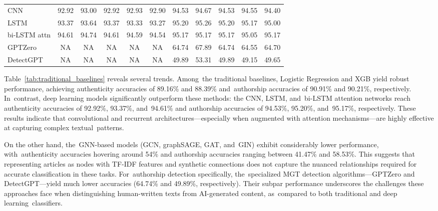 \documentclass[electronics,article,accept,pdftex,moreauthors,electronics]{Definitions/mdpi}
\begin{document}
\begin{table}[H]
{\begin{tabular}{lcccccccccc}
CNN &
92.92 & 93.00 & 92.92 & 92.93 & 92.90 &
 94.53 & 94.67 & 94.53 & 94.55 & 94.40 \\

LSTM &
93.37 & 93.64 & 93.37 & 93.33 & 93.27 &
 95.20 & 95.26 & 95.20 & 95.17 & 95.00 \\

bi-LSTM attn &
94.61 & 94.74 & 94.61 & 94.59 & 94.54 &
 95.17 & 95.17 & 95.17 & 95.05 & 95.17 \\

GPTZero &
NA & NA & NA & NA & NA &
 64.74 & 67.89 & 64.74 & 64.55 & 64.70 \\

DetectGPT &
NA & NA & NA & NA & NA &
49.89 & 53.31 & 49.89 & 49.15 & 49.65 \\
\bottomrule
\end{tabular}
}
\end{table}






Table~\ref{tab:traditional_baselines} reveals several trends. Among~the traditional baselines, Logistic Regression and XGB yield robust performance, achieving authenticity accuracies of 89.16\% and 88.39\% and~authorship accuracies of 90.91\% and 90.21\%, respectively. In~contrast, deep learning models significantly outperform these methods: the CNN, LSTM, and~bi-LSTM attention networks reach authenticity accuracies of 92.92\%, 93.37\%, and~94.61\% and authorship accuracies of 94.53\%, 95.20\%, and~95.17\%, respectively. These results indicate that convolutional and recurrent architectures---especially when augmented with attention mechanisms---are highly effective at capturing complex textual~patterns.

On the other hand, the~GNN-based models (GCN, graphSAGE, GAT, and~GIN) exhibit considerably lower performance, with~authenticity accuracies hovering around 54\% and authorship accuracies ranging between 41.47\% and 58.53\%. This suggests that representing articles as nodes with TF-IDF features and synthetic connections does not capture the nuanced relationships required for accurate classification in these tasks. For~authorship detection specifically, the~specialized MGT detection algorithms---GPTZero and DetectGPT---yield much lower accuracies (64.74\% and 49.89\%, respectively). Their subpar performance underscores the challenges these approaches face when distinguishing human-written texts from AI-generated content, as~compared to both traditional and deep learning~classifiers.
\end{document}
